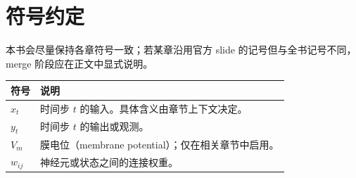 \section{符号约定}
本书会尽量保持各章符号一致；若某章沿用官方 slide 的记号但与全书记号不同，merge 阶段应在正文中显式说明。

\begin{longtable}{p{}p{}}
\textbf{符号} & \textbf{说明}\\
\hline
$x_t$ & 时间步 $t$ 的输入。具体含义由章节上下文决定。\\
$y_t$ & 时间步 $t$ 的输出或观测。\\
$V_m$ & 膜电位（membrane potential）；仅在相关章节中启用。\\
$w_{ij}$ & 神经元或状态之间的连接权重。\\
\end{longtable}
